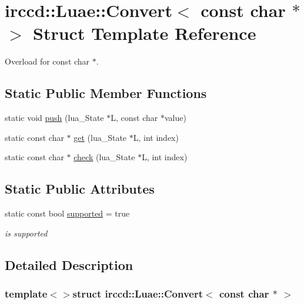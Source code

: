 \hypertarget{a00009}{\section{irccd\-:\-:Luae\-:\-:Convert$<$ const char $\ast$ $>$ Struct Template Reference}
\label{a00009}
}


Overload for const char $\ast$.  


\subsection*{Static Public Member Functions}
\begin{DoxyCompactItemize}
\item 
static void \hyperlink{a00009_afcf713b3a74c3d681364e09ff3220bc7}{push} (lua\-\_\-\-State $\ast$L, const char $\ast$value)
\item 
static const char $\ast$ \hyperlink{a00009_a5311ee20750d3e9dbb68ff081ac188e1}{get} (lua\-\_\-\-State $\ast$L, int index)
\item 
static const char $\ast$ \hyperlink{a00009_ac1dca2e06d7eb3d339f1eca0d3ef5a88}{check} (lua\-\_\-\-State $\ast$L, int index)
\end{DoxyCompactItemize}
\subsection*{Static Public Attributes}
\begin{DoxyCompactItemize}
\item 
\hypertarget{a00009_a5f982c04e826b2640dc839c03594ebab}{static const bool \hyperlink{a00009_a5f982c04e826b2640dc839c03594ebab}{supported} = true}\label{a00009_a5f982c04e826b2640dc839c03594ebab}

\begin{DoxyCompactList}\small\item\em is supported \end{DoxyCompactList}\end{DoxyCompactItemize}


\subsection{Detailed Description}
\subsubsection*{template$<$$>$struct irccd\-::\-Luae\-::\-Convert$<$ const char $\ast$ $>$}

